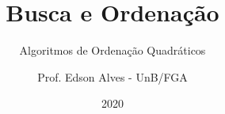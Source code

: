 \title{Busca e Ordenação}
\subtitle{Algoritmos de Ordenação Quadráticos}
\author{Prof. Edson Alves - UnB/FGA}
\date{2020}
